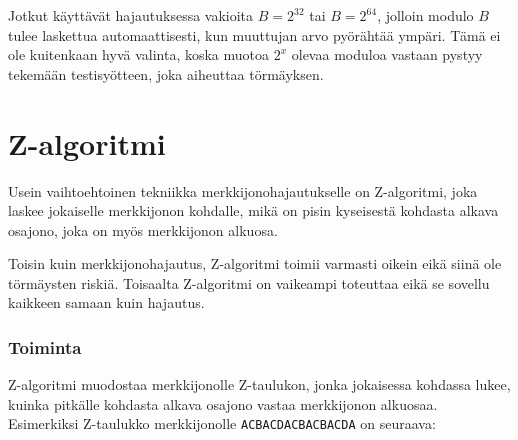 Jotkut käyttävät hajautuksessa vakioita $B=2^{32}$ tai $B=2^{64}$,
jolloin modulo $B$ tulee laskettua
automaattisesti, kun muuttujan arvo pyörähtää ympäri.
Tämä ei ole kuitenkaan hyvä valinta,
koska muotoa $2^x$ olevaa moduloa vastaan
pystyy tekemään testisyötteen, joka aiheuttaa törmäyksen.

\section{Z-algoritmi}

Usein vaihtoehtoinen tekniikka merkkijonohajautukselle
on Z-algoritmi, joka laskee jokaiselle
merkkijonon kohdalle,
mikä on pisin kyseisestä kohdasta alkava osajono,
joka on myös merkkijonon alkuosa.

Toisin kuin merkkijonohajautus, Z-algoritmi toimii
varmasti oikein eikä siinä ole törmäysten riskiä.
Toisaalta Z-algoritmi on vaikeampi toteuttaa eikä
se sovellu kaikkeen samaan kuin hajautus.

\subsubsection*{Toiminta}

Z-algoritmi muodostaa merkkijonolle Z-taulukon,
jonka jokaisessa kohdassa lukee,
kuinka pitkälle kohdasta
alkava osajono vastaa merkkijonon alkuosaa.
Esimerkiksi Z-taulukko
merkkijonolle \texttt{ACBACDACBACBACDA} on seuraava:

\begin{center}
\end{center}

